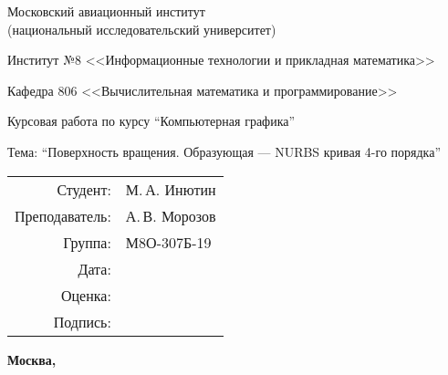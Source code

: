 \begin{titlepage}
\begin{center}
\bfseries

{\Large Московский авиационный институт\\ (национальный исследовательский университет)

}

\vspace{48pt}

{\large Институт №8 <<Информационные технологии и прикладная математика>>
}

\vspace{36pt}

{\large Кафедра 806 <<Вычислительная математика и программирование>>

}

\vspace{48pt}

Курсовая работа по курсу \enquote{Компьютерная графика}

Тема: \enquote{Поверхность вращения. Образующая --- NURBS кривая 4-го порядка}

\end{center}

\vspace{72pt}

\begin{flushright}
\begin{tabular}{rl}
Студент: & М.\,А. Инютин \\
Преподаватель: & А.\,В. Морозов \\
Группа: & М8О-307Б-19 \\
Дата: & \\
Оценка: & \\
Подпись: & \\
\end{tabular}
\end{flushright}

\vfill

\begin{center}
\bfseries
Москва, \the\year
\end{center}
\end{titlepage}

\pagebreak
